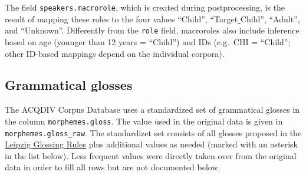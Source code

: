 \documentclass[a4paper, 11pt]{book}
\newcommand{\und}{\underline{{ }}\hspace{0.2mm}}	%
\begin{document}
The field \texttt{speakers.macrorole}, which is created during postprocessing, is the result of mapping these roles to the four values “Child”, “Target\und Child”, “Adult”, and “Unknown”. Differently from the \texttt{role} field, macroroles also include inference based on age (younger than 12 years = “Child”) and IDs (e.g.\ CHI = “Child”; other ID-based mappings depend on the individual corpora). 


\subsection{Grammatical glosses}
\label{subsec:Grammatical glosses}

The ACQDIV Corpus Database uses a standardized set of grammatical glosses in the column \texttt{morphemes.gloss}. The value used in the original data is given in \texttt{morphemes.gloss\und raw}. The standardizet set consists of all glosses proposed in the \href{http://www.eva.mpg.de/lingua/resources/glossing-rules.php}{Leipzig Glossing Rules} plus additional values as needed (marked with an asterisk in the list below). Less frequent values were directly taken over from the original data in order to fill all rows but are not documented below. 
\end{document}
